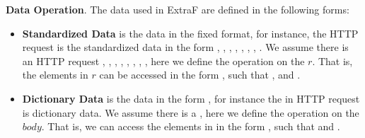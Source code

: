 \noindent\textbf{Data Operation}.
The data used in ExtraF are defined in the following forms:
\vspace{-2mm}
\begin{itemize}
\item \textbf{Standardized Data} is the data in the fixed format, for instance, the HTTP request is the standardized data in the form , , , , , , , .  We assume there is an HTTP request   ,  ,  ,  ,  ,  \myss{\myangle{}},  \myss{\myangle{}},  \myss{\myangle{}\rangle}, here we define the operation on the $r$. That is, the elements in $r$ can be accessed in the form , such that ,   and .
\item \textbf{Dictionary Data} is the data in the form , for instance the  in HTTP request is dictionary data. We assume there is a , here we define the operation on the $body$. That is, we can access the elements in  in the form , such that  and .
\end{itemize}
\vspace{-2mm}

